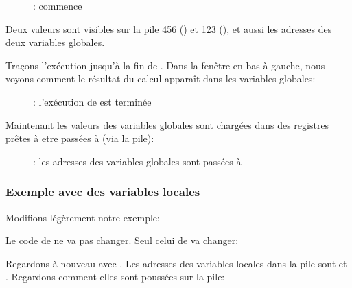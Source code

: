 \begin{figure}[H]
\centering
{}
\caption{\olly: \ttfone commence}
\label{fig:pointers_olly_global_2}
\end{figure}

Deux valeurs sont visibles sur la pile 456 () et 123 (), et aussi
les adresses des deux variables globales.

\clearpage
Traçons l'exécution jusqu'à la fin de \ttfone.
Dans la fenêtre en bas à gauche, nous voyons comment le résultat du calcul apparaît
dans les variables globales:

\begin{figure}[H]
\centering
{}
\caption{\olly: l'exécution de \ttfone est terminée}
\label{fig:pointers_olly_global_3}
\end{figure}

\clearpage

Maintenant les valeurs des variables globales sont chargées dans des registres prêtes
à etre passées à \printf (via la pile):

\begin{figure}[H]
\centering
{}
\caption{\olly: 
les adresses des variables globales sont passées à \printf}
\label{fig:pointers_olly_global_4}
\end{figure}

\subsubsection{Exemple avec des variables locales}

Modifions légèrement notre exemple:



Le code de \ttfone ne va pas changer.
Seul celui de \main va changer:



\newcommand{\PtrsAddresses}{\TT{0x2EF854} et \TT{0x2EF858}\xspace}

\clearpage
Regardons à nouveau avec \olly.
Les adresses des variables locales dans la pile sont \PtrsAddresses.
Regardons comment elles sont poussées sur la pile:

